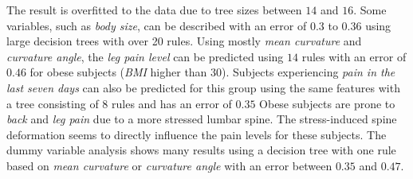\documentclass[a4paper,twoside]{style/article}
\begin{document}
The result is overfitted to the data due to tree sizes between $14$ and $16$.
Some variables, such as \emph{body size}, can be described with an error of $0.3$ to $0.36$ using large decision trees with over 20 rules.
Using mostly \emph{mean curvature} and \emph{curvature angle}, the \emph{leg pain level} can be predicted using $14$ rules with an error of $0.46$ for obese subjects (\emph{BMI} higher than $30$).
Subjects experiencing \emph{pain in the last seven days} can also be predicted for this group using the same features with a tree consisting of $8$ rules and has an error of $0.35$
Obese subjects are prone to \emph{back} and \emph{leg pain} due to a more stressed lumbar spine.
The stress-induced spine deformation seems to directly influence the pain levels for these subjects.
The dummy variable analysis shows many results using a decision tree with one rule based on \emph{mean curvature} or \emph{curvature angle} with an error between $0.35$ and $0.47$.
\end{document}
